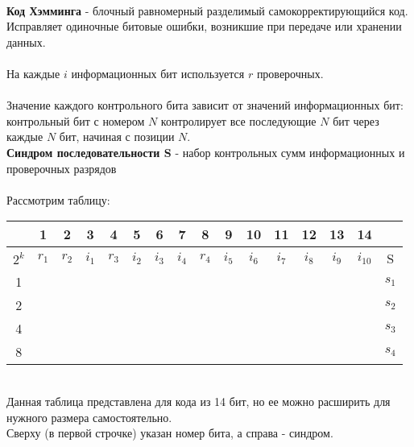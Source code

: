 \\\textbf{Код Хэмминга} - блочный равномерный разделимый самокорректирующийся код. Исправляет одиночные битовые ошибки, возникшие при передаче или хранении данных.
\\
\\На каждые $i$ информационных бит используется $r$ проверочных.
\\
\\Значение каждого контрольного бита зависит от значений информационных бит: контрольный бит с номером $N$ контролирует все последующие $N$ бит через каждые $N$ бит, начиная с позиции $N$.
\\\textbf{Синдром последовательности S} - набор контрольных сумм информационных и проверочных разрядов
\\
\\Рассмотрим таблицу:
\begin{table}[h]
\begin{tabular}{|c|c|c|c|c|c|c|c|c|c|c|c|c|c|c|c|}
\hline
& 1 & 2 & 3 & 4 & 5 & 6 & 7 & 8 & 9 & 10 & 11 & 12 & 13 & 14 & \\
\hline
$2^k$ & $r_{1}$ & $r_{2}$ & $i_{1}$ & $r_{3}$ & $i_{2}$ & $i_{3}$ & $i_{4}$ & $r_{4}$ & $i_{5}$ & $i_{6}$ & $i_{7}$ & $i_{8}$ & $i_{9}$ & $i_{10}$ & S\\
\hline
1 & \cellcolor{Gray1}{X} & & \cellcolor{Gray1}{X} & & \cellcolor{Gray1}{X} & & \cellcolor{Gray1}{X} & & \cellcolor{Gray1}{X} & & \cellcolor{Gray1}{X} & & \cellcolor{Gray1}{X} & & $s_{1}$\\
\hline
2 & & \cellcolor{Gray2}{X} & \cellcolor{Gray2}{X} & & & \cellcolor{Gray2}{X} & \cellcolor{Gray2}{X} & & & \cellcolor{Gray2}{X} & \cellcolor{Gray2}{X} & & & \cellcolor{Gray2}{X} & $s_{2}$ \\
\hline
4 & & & & \cellcolor{Gray3}{X} & \cellcolor{Gray3}{X} & \cellcolor{Gray3}{X} & \cellcolor{Gray3}{X} & & & & & \cellcolor{Gray3}{X} & \cellcolor{Gray3}{X} & \cellcolor{Gray3}{X} & $s_{3}$ \\
\hline
8 & & & & & & & & \cellcolor{Gray4}{X} & \cellcolor{Gray4}{X} & \cellcolor{Gray4}{X} & \cellcolor{Gray4}{X} & \cellcolor{Gray4}{X} & \cellcolor{Gray4}{X} & \cellcolor{Gray4}{X} & $s_{4}$ \\
\hline
\end{tabular}
\end{table}
\\Данная таблица представлена для кода из 14 бит, но ее можно расширить для нужного размера самостоятельно.
\\Сверху (в первой строчке) указан номер бита, а справа - синдром.
